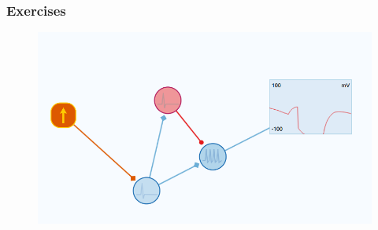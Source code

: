 \documentclass{beamer}
\begin{document}
\begin{frame}
\frametitle{Exercises}
\begin{figure}
\includegraphics[width = \textwidth]{exercises.png}
\end{figure}
\end{frame}
\end{document}
